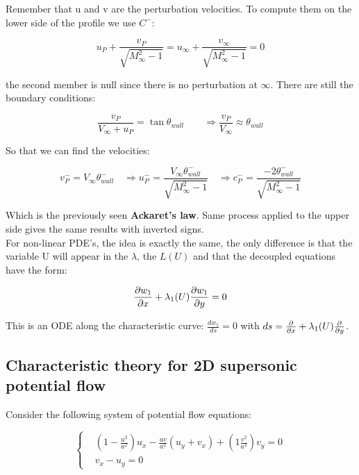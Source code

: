 	Remember that u and v are the perturbation velocities. To compute them on the lower side of the profile we use $C^-$: 
	
	\begin{equation}
	u_P + \frac{v_P}{\sqrt{M^2_\infty -1}} = u_\infty + \frac{v_\infty}{\sqrt{M^2_\infty -1}} = 0 
	\end{equation}
	
	the second member is null since there is no perturbation at $\infty$. There are still the boundary conditions: 
	
	\begin{equation}
	\frac{v_P}{V_\infty + u_P}= \tan \theta _{wall} \qquad \Rightarrow \frac{v_P}{V_\infty} \approx \theta _{wall}
	\end{equation}
	
	So that we can find the velocities:
	
	\begin{equation}
	v^-_P = V_\infty \theta^- _{wall} \quad \Rightarrow u_P^- = \frac{V_\infty\theta ^-_{wall}}{\sqrt{M_\infty ^2 - 1}} \quad \Rightarrow c_P^- = \frac{-2 \theta ^-_{wall}}{\sqrt{M_\infty ^2 - 1}}
	\end{equation}
	
	Which is the previously seen \textbf{Ackaret's law}. Same process applied to the upper side gives the same results with inverted signs. \\
	
	For non-linear PDE's, the idea is exactly the same, the only difference is that the variable U will appear in the $\lambda$, the $L(U)$ and that the decoupled equations have the form: 
	
	\begin{equation}
	\frac{\partial w_1}{\partial x} + \lambda _1(U) \frac{\partial w_1}{\partial y} = 0 
	\end{equation}
	
	This is an ODE along the characteristic curve: $\frac{dw_1}{ds} = 0$ with $ds = \frac{\partial}{\partial x} + \lambda_1(U) \frac{\partial}{\partial y}$.
	
\subsection{Characteristic theory for 2D supersonic potential flow}
	Consider the following system of potential flow equations: 
	
	\begin{equation}
	\left\{
	\begin{aligned}
	&\left( 1 - \frac{u^2}{a^2} \right) u_x - \frac{uv}{a^2} (u_y + v_x) + \left( 1  \frac{v^2}{a^2} \right) v_y = 0\\
	& v_x - u_y = 0
	\end{aligned}
	\right.
	\end{equation}
	
